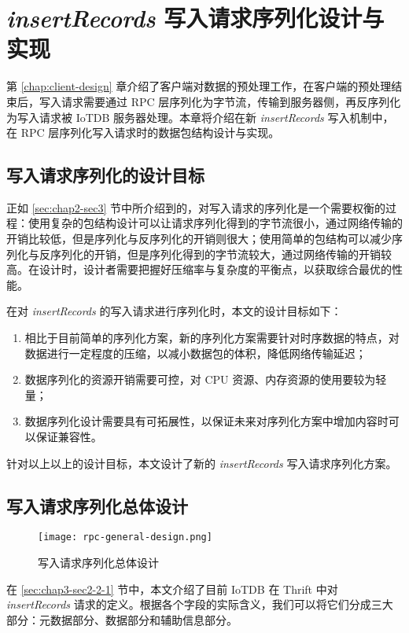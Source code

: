 
\chapter{\emph{insertRecords} 写入请求序列化设计与实现}
第 \ref{chap:client-design} 章介绍了客户端对数据的预处理工作，在客户端的预处理结束后，写入请求需要通过 RPC 层序列化为字节流，传输到服务器侧，再反序列化为写入请求被 IoTDB 服务器处理。本章将介绍在新 \emph{insertRecords} 写入机制中，在 RPC 层序列化写入请求时的数据包结构设计与实现。

\section{写入请求序列化的设计目标}
正如 \ref{sec:chap2-sec3} 节中所介绍到的，对写入请求的序列化是一个需要权衡的过程：使用复杂的包结构设计可以让请求序列化得到的字节流很小，通过网络传输的开销比较低，但是序列化与反序列化的开销则很大；使用简单的包结构可以减少序列化与反序列化的开销，但是序列化得到的字节流较大，通过网络传输的开销较高。在设计时，设计者需要把握好压缩率与复杂度的平衡点，以获取综合最优的性能。

在对 \emph{insertRecords} 的写入请求进行序列化时，本文的设计目标如下：
\begin{enumerate}
  \item 相比于目前简单的序列化方案，新的序列化方案需要针对时序数据的特点，对数据进行一定程度的压缩，以减小数据包的体积，降低网络传输延迟；
  \item 数据序列化的资源开销需要可控，对 CPU 资源、内存资源的使用要较为轻量；
  \item 数据序列化设计需要具有可拓展性，以保证未来对序列化方案中增加内容时可以保证兼容性。
\end{enumerate}
针对以上以上的设计目标，本文设计了新的 \emph{insertRecords} 写入请求序列化方案。

\section{写入请求序列化总体设计}
\begin{figure}
  \centering
  \texttt{[image: rpc-general-design.png]}
  \caption{写入请求序列化总体设计}
  \label{fig:rpc-general-design}
\end{figure}

在 \ref{sec:chap3-sec2-2-1} 节中，本文介绍了目前 IoTDB 在 Thrift 中对 \emph{insertRecords} 请求的定义。根据各个字段的实际含义，我们可以将它们分成三大部分：元数据部分、数据部分和辅助信息部分。

